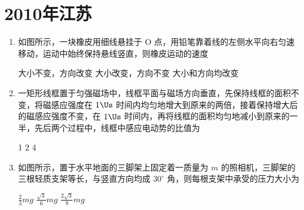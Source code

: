 \documentclass[\gkver]{gaokaozhenti}
\begin{document}
\chapter{2010年江苏}

\begin{enumerate}
\item
如图所示，一块橡皮用细线悬挂于 O 点，用铅笔靠着线的左侧水平向右匀速移动，运动中始终保持悬线竖直，则橡皮运动的速度


{大小不变，方向改变}
{大小改变，方向不变}
{大小和方向均改变}


\item
一矩形线框置于匀强磁场中，线框平面与磁场方向垂直，先保持线框的面积不变，将磁感应强度在 $1\Us$ 时间内均匀地增大到原来的两倍，接着保持增大后的磁感应强度不变，在 $1\Us$ 时间内，再将线框的面积均匀地减小到原来的一半，先后两个过程中，线框中感应电动势的比值为

{1}
{2}
{4}


\item
如图所示，置于水平地面的三脚架上固定着一质量为 $m$ 的照相机，三脚架的三根轻质支架等长，与竖直方向均成 $30^{\circ}$ 角，则每根支架中承受的压力大小为


{$\frac{2}{3}mg$}
{$\frac{\sqrt{3}}{6}mg$}
{$\frac{2\sqrt{3}}{9}mg$}


\end{enumerate}
\end{document}
